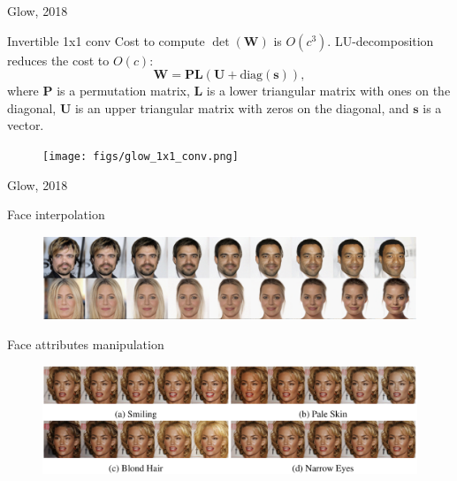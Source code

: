 \begin{frame}{Glow, 2018}
	\begin{block}{Invertible 1x1 conv}
		Cost to compute $\det (\mathbf{W})$ is $O(c^3)$. 
		LU-decomposition reduces the cost to $O(c)$:
		\[
		\mathbf{W} = \mathbf{P}\mathbf{L}(\mathbf{U} + \text{diag}(\mathbf{s})),
		\]
		where $\mathbf{P}$ is a permutation matrix, $\mathbf{L}$ is a lower triangular matrix with ones on the diagonal, $\mathbf{U}$ is an
		upper triangular matrix with zeros on the diagonal, and $\mathbf{s}$ is a vector.
	\end{block}
	\begin{figure}
		\centering
		\texttt{[image: figs/glow\_1x1\_conv.png]}
	\end{figure}

\end{frame}
\begin{frame}{Glow, 2018}
	\begin{block}{Face interpolation}
		\vspace{-0.3cm}
		\begin{figure}
			\centering
			\includegraphics[width=\linewidth]{figs/glow_interpolation.png}
		\end{figure}
		\vspace{-0.3cm}
	\end{block}
	\begin{block}{Face attributes manipulation}
		\begin{figure}
			\centering
			\includegraphics[width=\linewidth]{figs/glow_attributes.png}
		\end{figure}
	\end{block}

\end{frame}
